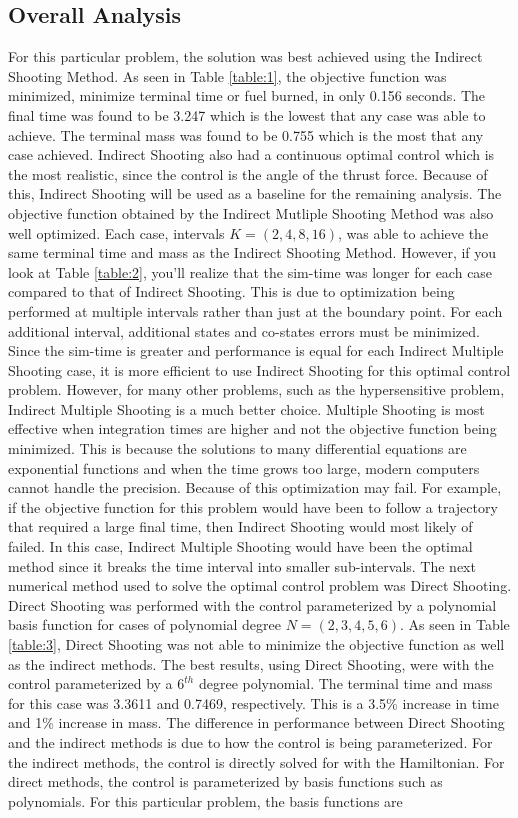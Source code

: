 \documentclass[]{article}
\begin{document}
\subsection{Overall Analysis}
For this particular problem, the solution was best achieved using the Indirect Shooting Method. As seen in Table \ref{table:1}, the objective function was minimized, minimize terminal time or fuel burned, in only 0.156 seconds. The final time was found to be 3.247 which is the lowest that any case was able to achieve. The terminal mass was found to be 0.755 which is the most that any case achieved. Indirect Shooting also had a continuous optimal control which is the most realistic, since the control is the angle of the thrust force. Because of this, Indirect Shooting will be used as a baseline for the remaining analysis. The objective function obtained by the Indirect Mutliple Shooting Method was also well optimized. Each case, intervals \(K = (2,4,8,16)\), was able to achieve the same terminal time and mass as the Indirect Shooting Method. However, if you look at Table \ref{table:2}, you'll realize that the sim-time was longer for each case compared to that of Indirect Shooting. This is due to optimization being performed at multiple intervals rather than just at the boundary point. For each additional interval, additional states and co-states errors must be minimized. Since the sim-time is greater and performance is equal for each Indirect Multiple Shooting case, it is more efficient to use Indirect Shooting for this optimal control problem. However, for many other problems, such as the hypersensitive problem, Indirect Multiple Shooting is a much better choice. Multiple Shooting is most effective when integration times are higher and not the objective function being minimized. This is because the solutions to many differential equations are exponential functions and when the time grows too large, modern computers cannot handle the precision. Because of this optimization may fail. For example, if the objective function for this problem would have been to follow a trajectory that required a large final time, then Indirect Shooting would most likely of failed. In this case, Indirect Multiple Shooting would have been the optimal method since it breaks the time interval into smaller sub-intervals. The next numerical method used to solve the optimal control problem was Direct Shooting. Direct Shooting was performed with the control parameterized by a polynomial basis function for cases of polynomial degree \(N = (2,3,4,5,6)\). As seen in Table \ref{table:3}, Direct Shooting was not able to minimize the objective function as well as the indirect methods. The best results, using Direct Shooting, were with the control parameterized by a \(6^{th}\) degree polynomial. The terminal time and mass for this case was 3.3611 and 0.7469, respectively. This is a 3.5\% increase in time and 1\% increase in mass. The difference in performance between Direct Shooting and the indirect methods is due to how the control is being parameterized. For the indirect methods, the control is directly solved for with the Hamiltonian. For direct methods, the control is parameterized by basis functions such as polynomials. For this particular problem, the basis functions are 
\end{document}
